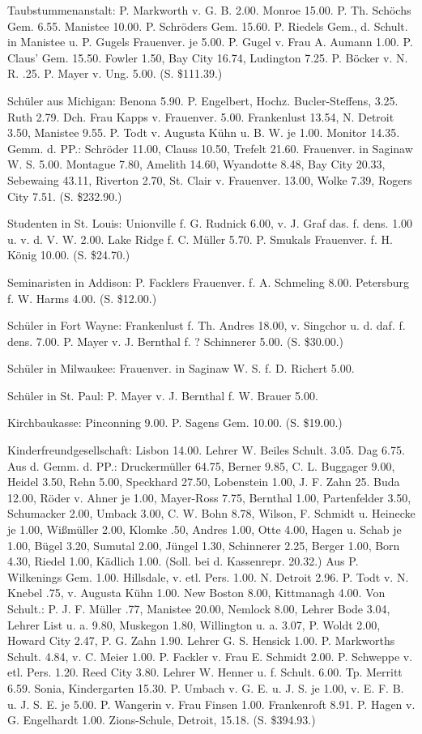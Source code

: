 Taubstummenanstalt: P. Markworth v. G. B. 2.00. Monroe 15.00. P. Th. Schöchs Gem. 6.55. Manistee 10.00. P. Schröders Gem. 15.60. P. Riedels Gem., d. Schult. in Manistee u. P. Gugels Frauenver. je 5.00. P. Gugel v. Frau A. Aumann 1.00. P. Claus’ Gem. 15.50. Fowler 1.50, Bay City 16.74, Ludington 7.25. P. Böcker v. N. R. .25. P. Mayer v. Ung. 5.00. (S. \$111.39.)

Schüler aus Michigan: Benona 5.90. P. Engelbert, Hochz. Bucler-Steffens, 3.25. Ruth 2.79. Dch. Frau Kapps v. Frauenver. 5.00. Frankenlust 13.54, N. Detroit 3.50, Manistee 9.55. P. Todt v. Augusta Kühn u. B. W. je 1.00. Monitor 14.35. Gemm. d. PP.: Schröder 11.00, Clauss 10.50, Trefelt 21.60. Frauenver. in Saginaw W. S. 5.00. Montague 7.80, Amelith 14.60, Wyandotte 8.48, Bay City 20.33, Sebewaing 43.11, Riverton 2.70, St. Clair v. Frauenver. 13.00, Wolke 7.39, Rogers City 7.51. (S. \$232.90.)

Studenten in St. Louis: Unionville f. G. Rudnick 6.00, v. J. Graf das. f. dens. 1.00 u. v. d. V. W. 2.00. Lake Ridge f. C. Müller 5.70. P. Smukals Frauenver. f. H. König 10.00. (S. \$24.70.)

Seminaristen in Addison: P. Facklers Frauenver. f. A. Schmeling 8.00. Petersburg f. W. Harms 4.00. (S. \$12.00.)

Schüler in Fort Wayne: Frankenlust f. Th. Andres 18.00, v. Singchor u. d. daf. f. dens. 7.00. P. Mayer v. J. Bernthal f. ? Schinnerer 5.00. (S. \$30.00.)

Schüler in Milwaukee: Frauenver. in Saginaw W. S. f. D. Richert 5.00.

Schüler in St. Paul: P. Mayer v. J. Bernthal f. W. Brauer 5.00.

Kirchbaukasse: Pinconning 9.00. P. Sagens Gem. 10.00. (S. \$19.00.)

Kinderfreundgesellschaft: Lisbon 14.00. Lehrer W. Beiles Schult. 3.05. Dag 6.75. Aus d. Gemm. d. PP.: Druckermüller 64.75, Berner 9.85, C. L. Buggager 9.00, Heidel 3.50, Rehn 5.00, Speckhard 27.50, Lobenstein 1.00, J. F. Zahn 25. Buda 12.00, Röder v. Ahner je 1.00, Mayer-Ross 7.75, Bernthal 1.00, Partenfelder 3.50, Schumacker 2.00, Umback 3.00, C. W. Bohn 8.78, Wilson, F. Schmidt u. Heinecke je 1.00, Wißmüller 2.00, Klomke .50, Andres 1.00, Otte 4.00, Hagen u. Schab je 1.00, Bügel 3.20, Sumutal 2.00, Jüngel 1.30, Schinnerer 2.25, Berger 1.00, Born 4.30, Riedel 1.00, Kädlich 1.00. (Soll. bei d. Kassenrepr. 20.32.) Aus P. Wilkenings Gem. 1.00. Hillsdale, v. etl. Pers. 1.00. N. Detroit 2.96. P. Todt v. N. Knebel .75, v. Augusta Kühn 1.00. New Boston 8.00, Kittmanagh 4.00. Von Schult.: P. J. F. Müller .77, Manistee 20.00, Nemlock 8.00, Lehrer Bode 3.04, Lehrer List u. a. 9.80, Muskegon 1.80, Willington u. a. 3.07, P. Woldt 2.00, Howard City 2.47, P. G. Zahn 1.90. Lehrer G. S. Hensick 1.00. P. Markworths Schult. 4.84, v. C. Meier 1.00. P. Fackler v. Frau E. Schmidt 2.00. P. Schweppe v. etl. Pers. 1.20. Reed City 3.80. Lehrer W. Henner u. f. Schult. 6.00. Tp. Merritt 6.59. Sonia, Kindergarten 15.30. P. Umbach v. G. E. u. J. S. je 1.00, v. E. F. B. u. J. S. E. je 5.00. P. Wangerin v. Frau Finsen 1.00. Frankenroft 8.91. P. Hagen v. G. Engelhardt 1.00. Zions-Schule, Detroit, 15.18. (S. \$394.93.)

